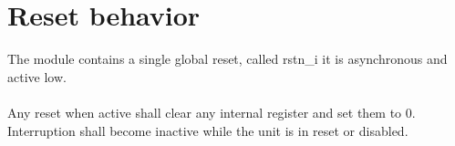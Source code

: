 \section{Reset behavior}

The module contains a single global reset, called rstn\_i it is asynchronous and active low.\\
\\
Any reset when active shall clear any internal register and set them to 0. Interruption shall become inactive while the unit is in reset or disabled.




